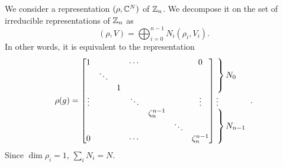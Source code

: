 \documentclass[a4paper,10pt]{article}
\begin{document}
        We consider a representation $(\rho,\mathbb{C}^N)$ of $\mathbb{Z}_n$. We decompose it on the set of irreducible representations of $\mathbb{Z}_n$ as
        \begin{equation}
            (\rho,V)=\bigoplus^{n-1}_{i=0}N_i(\rho_i,V_i).
        \end{equation}
        In other words, it is equivalent to the representation
        \begin{equation}
            \rho(g)=
            \begin{bmatrix}
                1 & & & \cdots & & & 0 \\
                & \ddots & & & & & \\
                & & 1 & & & &  \\
                \vdots & & & \ddots & & & \vdots \\
                & & & & \zeta^{n-1}_n & & \\
                & & & & & \ddots & \\
                0 & & & \cdots & & & \zeta^{n-1}_n 
            \end{bmatrix}
            \hspace{-0.2cm}
            \begin{tabular}{l}
            $\left.\lefteqn{\phantom{
                \begin{matrix}
                    a_0\\ \ddots\\ a_0\ 
                \end{matrix} 
            }}\right\}N_0$\\
            \vdots \\
            $\left.\lefteqn{\phantom{
                \begin{matrix}
                    b_0\\ \ddots\\ b_0\ 
                \end{matrix}
            }} \right\}N_{n-1}$
            \end{tabular}.\label{eq:reprrhoZn}
        \end{equation}
        Since $\dim\rho_i=1$, $\sum_i N_i=N$. 
\end{document}

